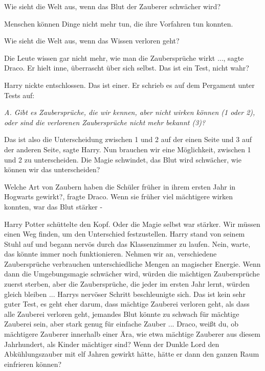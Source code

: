 \glqq{}Wie sieht die Welt aus, wenn das Blut der Zauberer schwächer wird?\grqq{}

\glqq{}Menschen können Dinge nicht mehr tun, die ihre Vorfahren tun
konnten.\grqq{}

\glqq{}Wie sieht die Welt aus, wenn das Wissen verloren geht?\grqq{}

\glqq{}Die Leute wissen gar nicht mehr, wie man die Zaubersprüche
wirkt ...\grqq{}, sagte Draco. Er hielt inne, überrascht über sich selbst.
\glqq{} Das ist ein Test, nicht wahr?\grqq{}

Harry nickte entschlossen. \glqq{}Das ist einer.\grqq{} Er schrieb es auf dem
Pergament unter Tests auf:

\emph{A. Gibt es Zaubersprüche, die wir kennen, aber nicht wirken können (1 oder
2), oder sind die verlorenen Zaubersprüche nicht mehr bekannt (3)?}

\glqq{}Das ist also die Unterscheidung zwischen 1 und 2 auf der einen Seite und
3 auf der anderen Seite\grqq{}, sagte Harry. \glqq{}Nun brauchen wir eine
Möglichkeit, zwischen 1 und 2 zu unterscheiden. Die Magie schwindet, das Blut
wird schwächer, wie können wir das unterscheiden?\grqq{}

\glqq{}Welche Art von Zaubern haben die Schüler früher in ihrem ersten Jahr in
Hogwarts gewirkt?\grqq{}, fragte Draco. \glqq{}Wenn sie früher viel mächtigere
wirken konnten, war das Blut stärker -\grqq{}

Harry Potter schüttelte den Kopf. \glqq{}Oder die Magie selbst war stärker. Wir
müssen einen Weg finden, um den Unterschied festzustellen.\grqq{} Harry stand
von seinem Stuhl auf und begann nervös durch das Klassenzimmer zu laufen.
\glqq{} Nein, warte, das könnte immer noch funktionieren. Nehmen wir an,
verschiedene Zaubersprüche verbrauchen unterschiedliche Mengen an magischer
Energie. Wenn dann die Umgebungsmagie schwächer wird, würden die mächtigen
Zaubersprüche zuerst sterben, aber die Zaubersprüche, die jeder im ersten Jahr
lernt, würden gleich bleiben ...\grqq{} Harrys nervöser Schritt beschleunigte
sich. \glqq{}Das ist kein sehr guter Test, es geht eher darum, dass mächtige
Zauberei verloren geht, als dass alle Zauberei verloren geht, jemandes Blut
könnte zu schwach für mächtige Zauberei sein, aber stark genug für einfache
Zauber ... Draco, weißt du, ob mächtigere Zauberer innerhalb einer Ära, wie etwa
mächtige Zauberer aus diesem Jahrhundert, als Kinder mächtiger sind? Wenn der
Dunkle Lord den Abkühlungszauber mit elf Jahren gewirkt hätte, hätte er dann den
ganzen Raum einfrieren können?\grqq{}


